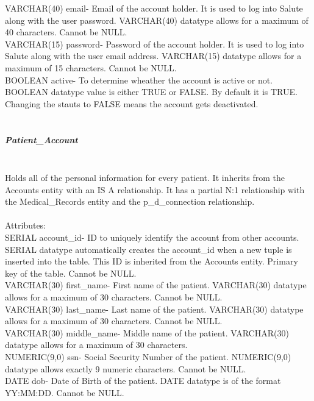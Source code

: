 \documentclass[12pt]{report}
\begin{document}
VARCHAR(40) email- Email of the account holder. It is used to log into Salute along with the user password.  VARCHAR(40) datatype allows for a maximum of 40 characters.  Cannot be NULL.\\

VARCHAR(15) password-  Password of the account holder.  It is used to log into Salute along with the user email address.  VARCHAR(15) datatype allows for a maximum of 15 characters.  Cannot be NULL.\\

BOOLEAN active- To determine wheather the account is active or not.  BOOLEAN datatype value is either TRUE or FALSE.  By default it is TRUE.  Changing the stauts to FALSE means the account gets deactivated.\\  \\

\subparagraph{Patient_Account}\\
Holds all of the personal information for every patient.  It inherits from the Accounts entity with an IS A relationship.  It has a partial N:1 relationship with the Medical_Records entity and the p_d_connection relationship.\\ \\

Attributes:\\
SERIAL account_id- ID to uniquely identify the account from other accounts. SERIAL datatype automatically creates the account_id when a new tuple is inserted into the table.  This ID is inherited from the Accounts entity. Primary key of the table.  Cannot be NULL.\\

VARCHAR(30) first_name-  First name of the patient.  VARCHAR(30) datatype allows for a maximum of 30 characters.  Cannot be NULL.\\

VARCHAR(30) last_name- Last name of the patient.  VARCHAR(30) datatype allows for a maximum of 30 characters.  Cannot be NULL.\\ 

VARCHAR(30) middle_name- Middle name of the patient. VARCHAR(30) datatype allows for a maximum of 30 characters.\\

NUMERIC(9,0) ssn- Social Security Number of the patient. NUMERIC(9,0) datatype allows exactly 9 numeric characters.  Cannot be NULL.\\

DATE dob- Date of Birth of the patient.  DATE datatype is of the format YY:MM:DD.  Cannot be NULL.\\
\end{document}
